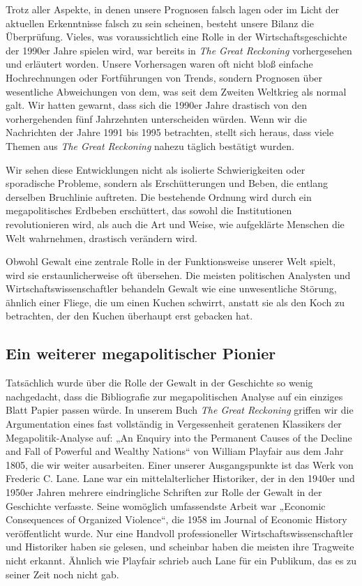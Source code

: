 \documentclass[
  a5paper,
  smalldemyvopaper,10pt,twoside,onecolumn,openright,extrafontsizes,hidelinks]{memoir}
\begin{document}
Trotz aller Aspekte, in denen unsere Prognosen falsch lagen oder im
Licht der aktuellen Erkenntnisse falsch zu sein scheinen, besteht unsere
Bilanz die Überprüfung. Vieles, was voraussichtlich eine Rolle in der
Wirtschaftsgeschichte der 1990er Jahre spielen wird, war bereits in
\emph{The Great Reckoning} vorhergesehen und erläutert worden. Unsere
Vorhersagen waren oft nicht bloß einfache Hochrechnungen oder
Fortführungen von Trends, sondern Prognosen über wesentliche
Abweichungen von dem, was seit dem Zweiten Weltkrieg als normal galt.
Wir hatten gewarnt, dass sich die 1990er Jahre drastisch von den
vorhergehenden fünf Jahrzehnten unterscheiden würden. Wenn wir die
Nachrichten der Jahre 1991 bis 1995 betrachten, stellt sich heraus, dass
viele Themen aus \emph{The Great Reckoning} nahezu täglich bestätigt
wurden.

Wir sehen diese Entwicklungen nicht als isolierte Schwierigkeiten oder
sporadische Probleme, sondern als Erschütterungen und Beben, die entlang
derselben Bruchlinie auftreten. Die bestehende Ordnung wird durch ein
megapolitisches Erdbeben erschüttert, das sowohl die Institutionen
revolutionieren wird, als auch die Art und Weise, wie aufgeklärte
Menschen die Welt wahrnehmen, drastisch verändern wird.

Obwohl Gewalt eine zentrale Rolle in der Funktionsweise unserer Welt
spielt, wird sie erstaunlicherweise oft übersehen. Die meisten
politischen Analysten und Wirtschaftswissenschaftler behandeln Gewalt
wie eine unwesentliche Störung, ähnlich einer Fliege, die um einen
Kuchen schwirrt, anstatt sie als den Koch zu betrachten, der den Kuchen
überhaupt erst gebacken hat.

\subsection{Ein weiterer megapolitischer
Pionier}\label{ein-weiterer-megapolitischer-pionier}

Tatsächlich wurde über die Rolle der Gewalt in der Geschichte so wenig
nachgedacht, dass die Bibliografie zur megapolitischen Analyse auf ein
einziges Blatt Papier passen würde. In unserem Buch \emph{The Great
Reckoning} griffen wir die Argumentation eines fast vollständig in
Vergessenheit geratenen Klassikers der Megapolitik-Analyse auf: „An
Enquiry into the Permanent Causes of the Decline and Fall of Powerful
and Wealthy Nations`` von William Playfair aus dem Jahr 1805, die wir
weiter ausarbeiten. Einer unserer Ausgangspunkte ist das Werk von
Frederic C. Lane. Lane war ein mittelalterlicher Historiker, der in den
1940er und 1950er Jahren mehrere eindringliche Schriften zur Rolle der
Gewalt in der Geschichte verfasste. Seine womöglich umfassendste Arbeit
war „Economic Consequences of Organized Violence``, die 1958 im Journal
of Economic History veröffentlicht wurde. Nur eine Handvoll
professioneller Wirtschaftswissenschaftler und Historiker haben sie
gelesen, und scheinbar haben die meisten ihre Tragweite nicht erkannt.
Ähnlich wie Playfair schrieb auch Lane für ein Publikum, das es zu
seiner Zeit noch nicht gab.
\end{document}
